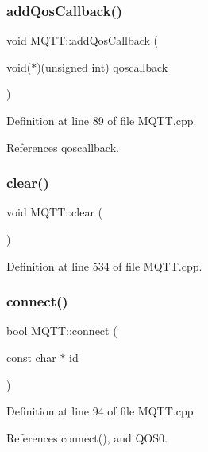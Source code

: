 \subsubsection{\texorpdfstring{add\+Qos\+Callback()}{addQosCallback()}}
{\footnotesize\ttfamily void M\+Q\+T\+T\+::add\+Qos\+Callback (\begin{DoxyParamCaption}\item[{void($\ast$)(unsigned int)}]{qoscallback }\end{DoxyParamCaption})}



Definition at line 89 of file M\+Q\+T\+T.\+cpp.



References qoscallback.

\mbox{\label{class_m_q_t_t_a510932d1c5fb0c918debcf60cfc267e1}} 
\subsubsection{\texorpdfstring{clear()}{clear()}}
{\footnotesize\ttfamily void M\+Q\+T\+T\+::clear (\begin{DoxyParamCaption}{ }\end{DoxyParamCaption})}



Definition at line 534 of file M\+Q\+T\+T.\+cpp.

\mbox{\label{class_m_q_t_t_ae76d538b01191df33610a950bf4e9717}} 
\subsubsection{\texorpdfstring{connect()}{connect()}\hspace{0.1cm}{\footnotesize\ttfamily [1/3]}}
{\footnotesize\ttfamily bool M\+Q\+T\+T\+::connect (\begin{DoxyParamCaption}\item[{const char $\ast$}]{id }\end{DoxyParamCaption})}



Definition at line 94 of file M\+Q\+T\+T.\+cpp.



References connect(), and Q\+O\+S0.

